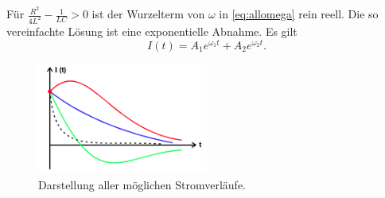 Für $\frac{{R^2}}{4{L^2}}-\frac{1}{{LC}}>0$ 
ist der Wurzelterm von $\omega$ in \eqref{eq:allomega} rein reell.
Die so vereinfachte Lösung ist eine exponentielle Abnahme.
Es gilt
\begin{equation}
	I(t)= A_1 e^{\omega_1 t} + A_2 e^{\omega_2 t}.
\end{equation}
\begin{figure}
	\centering
	\includegraphics[width=0.5\textwidth]{Bilder/Loesungsform.png}
	\caption{Darstellung aller möglichen Stromverläufe. \cite{v354}}
\end{figure}

